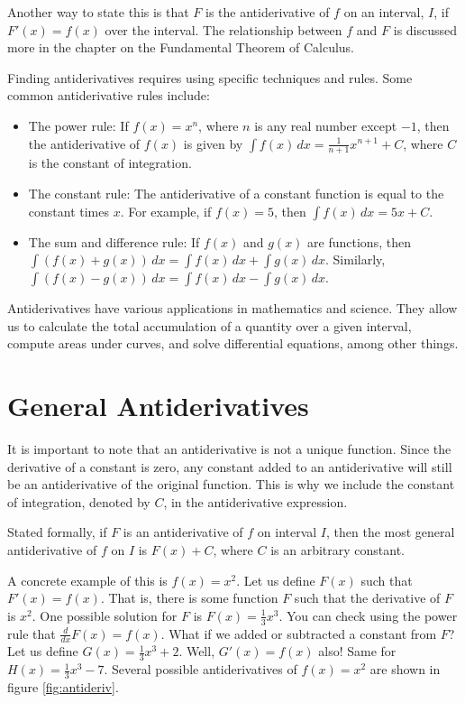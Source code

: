 Another way to state this is that $F$ is the antiderivative of $f$ on 
an interval, $I$, if $F'(x) = f(x)$ over the interval. The 
relationship between $f$ and $F$ is discussed more in the chapter on 
the Fundamental Theorem of Calculus. 

Finding antiderivatives requires using specific techniques and
rules. Some common antiderivative rules include:

\begin{itemize}
\item The power rule: If $f(x) = x^n$, where $n$ is any real number
  except $-1$, then the antiderivative of $f(x)$ is given by $\int
  f(x)\,dx = \frac{1}{n+1}x^{n+1} + C$, where $C$ is the constant of
  integration.

\item The constant rule: The antiderivative of a constant function is
  equal to the constant times $x$. For example, if $f(x) = 5$, then
  $\int f(x)\, dx = 5x + C$.

\item The sum and difference rule: If $f(x)$ and $g(x)$ are functions,
  then $\int (f(x) + g(x)) \, dx = \int f(x) \, dx + \int g(x) \,
  dx$. Similarly, $\int (f(x) - g(x))\,dx = \int f(x) \, dx - \int
  g(x) \, dx$.
\end{itemize}

Antiderivatives have various applications in mathematics and
science. They allow us to calculate the total accumulation of a
quantity over a given interval, compute areas under curves, and solve
differential equations, among other things.

\section{General Antiderivatives}

It is important to note that an antiderivative is not a unique
function. Since the derivative of a constant is zero, any constant
added to an antiderivative will still be an antiderivative of the
original function. This is why we include the constant of integration,
denoted by $C$, in the antiderivative expression.

Stated formally, if $F$ is an antiderivative of $f$ on interval $I$, 
then the most general antiderivative of $f$ on $I$ is $F(x) + C$, 
where $C$ is an arbitrary constant. 


A concrete example of this is $f(x) = x^2$. Let us define $F(x)$ such 
that $F'(x) = f(x)$. That is, there is some function $F$ such that the 
derivative of $F$ is $x^2$. One possible solution for $F$ is $F(x) = 
\frac{1}{3} x^3$. You can check using the power rule that $\frac{d}{dx} 
F(x) = f(x)$. What if we added or subtracted a constant from $F$? Let 
us define $G(x) = \frac{1}{3} x^3 + 2$. Well, $G'(x) = f(x)$ also! 
Same for $H(x) = \frac{1}{3} x^3 - 7$. Several possible antiderivatives 
of $f(x) = x^2$ are shown in figure \ref{fig:antideriv}. 

